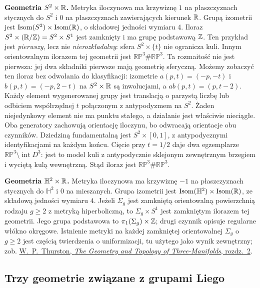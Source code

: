 \textbf{Geometria $S^2\times\mathbb{R}$.}
Metryka iloczynowa ma krzywiznę $1$ na płaszczyznach stycznych
do $S^2$ i $0$ na płaszczyznach zawierających kierunek $\mathbb{R}$.
Grupą izometrii jest
$\operatorname{Isom}(S^2)\times\operatorname{Isom}(\mathbb{R})$,
o składowej jedności wymiaru $4$.
Iloraz $S^2\times(\mathbb{R}/\mathbb{Z})=S^2\times S^1$ jest zamknięty i ma
grupę podstawową $\mathbb{Z}$. Ten przykład jest \emph{pierwszy}, lecz
nie \emph{nierozkładalny}: sfera $S^2\times\{t\}$ nie ogranicza
kuli. Innym orientowalnym ilorazem tej geometrii jest
$\mathbb{RP}^3\#\mathbb{RP}^3$. Ta rozmaitość nie jest pierwsza:
jej dwa składniki pierwsze mają geometrię sferyczną.
Możemy zobaczyć ten iloraz bez odwołania do klasyfikacji:
izometrie $a(p,t)=(-p,-t)$ i $b(p,t)=(-p,2-t)$ na
$S^2\times\mathbb{R}$ są inwolucjami, a $ab(p,t)=(p,t-2)$.
Każdy element wygenerowanej grupy jest translacją o parzystą
liczbę lub odbiciem współrzędnej $t$ połączonym z antypodyzmem
na $S^2$. Żaden niejedynkowy element nie ma punktu stałego,
a działanie jest właściwie nieciągłe. Oba generatory zachowują
orientację iloczynu, bo odwracają orientacje obu czynników.
Dziedziną fundamentalną jest $S^2\times[0,1]$, z antypodycznymi
identyfikacjami na każdym końcu. Cięcie przy $t=1/2$ daje
dwa egzemplarze $\mathbb{RP}^3\setminus\operatorname{int}D^3$:
jest to model kuli z antypodycznie sklejonym zewnętrznym
brzegiem i wyciętą kulą wewnętrzną. Stąd iloraz jest
$\mathbb{RP}^3\#\mathbb{RP}^3$.

\textbf{Geometria $\mathbb H^2\times\mathbb{R}$.}
Metryka iloczynowa ma krzywiznę $-1$ na płaszczyznach stycznych
do $\mathbb H^2$ i $0$ na mieszanych. Grupa izometrii jest
$\operatorname{Isom}(\mathbb H^2)\times\operatorname{Isom}(\mathbb{R})$,
ze składową jedności wymiaru $4$.
Jeżeli $\Sigma_g$ jest zamkniętą orientowalną powierzchnią
rodzaju $g\geq2$ z metryką hiperboliczną, to
$\Sigma_g\times S^1$ jest zamkniętym ilorazem tej geometrii.
Jego grupa podstawowa to $\pi_1(\Sigma_g)\times\mathbb{Z}$;
drugi czynnik opisuje regularne włókno okręgowe.
Istnienie metryki na każdej zamkniętej orientowalnej
$\Sigma_g$ o $g\geq2$ jest częścią twierdzenia o uniformizacji,
tu użytego jako wynik zewnętrzny; zob.
\href{https://library.slmath.org/nonmsri/gt3m/PDF/Thurston-gt3m.pdf}
{W.\ P.\ Thurston, \emph{The Geometry and Topology of
Three-Manifolds}, rozdz.\ 2}.

\subsection*{Trzy geometrie związane z grupami Liego}

